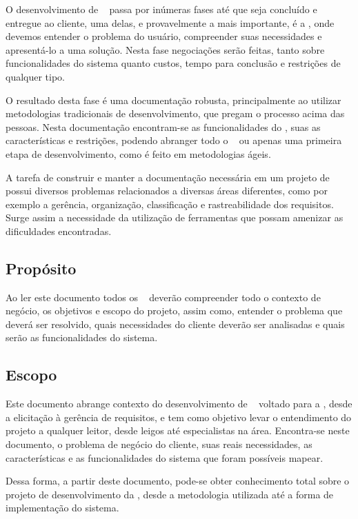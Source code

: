 
O desenvolvimento de \sw~ passa por inúmeras fases até que seja concluído e entregue ao cliente, uma delas, e provavelmente a mais importante, é a \er, onde devemos entender o problema do usuário, compreender suas necessidades e apresentá-lo a uma solução. Nesta fase negociações serão feitas, tanto sobre funcionalidades do sistema quanto custos, tempo para conclusão e restrições de qualquer tipo.

O resultado desta fase é uma documentação robusta, principalmente ao utilizar metodologias tradicionais de desenvolvimento, que pregam o processo acima das pessoas. Nesta documentação encontram-se as funcionalidades do \sw, suas as características e restrições, podendo abranger todo o \sw~ ou apenas uma primeira etapa de desenvolvimento, como é feito em metodologias ágeis.

A tarefa de construir e manter a documentação necessária em um projeto de \sw~ possui diversos problemas relacionados a diversas áreas diferentes, como por exemplo a gerência, organização, classificação e rastreabilidade dos requisitos. Surge assim a necessidade da utilização de ferramentas que possam amenizar as dificuldades encontradas.

\subsection{Propósito}

Ao ler este documento todos os \stakeholder~ deverão compreender todo o contexto de negócio, os objetivos e escopo do projeto, assim como, entender o problema que deverá ser resolvido, quais necessidades do cliente deverão ser analisadas e quais serão as funcionalidades do sistema.

\subsection{Escopo}

Este documento abrange contexto do desenvolvimento de \sw~ voltado para a \er, desde a elicitação à gerência de requisitos, e tem como objetivo levar o entendimento do projeto a qualquer leitor, desde leigos até especialistas na área. Encontra-se neste documento, o problema de negócio do cliente, suas reais necessidades, as características e as funcionalidades do sistema que foram possíveis mapear.

Dessa forma, a partir deste documento, pode-se obter conhecimento total sobre o projeto de desenvolvimento da \nomeferramenta, desde a metodologia utilizada até a forma de implementação do sistema.


